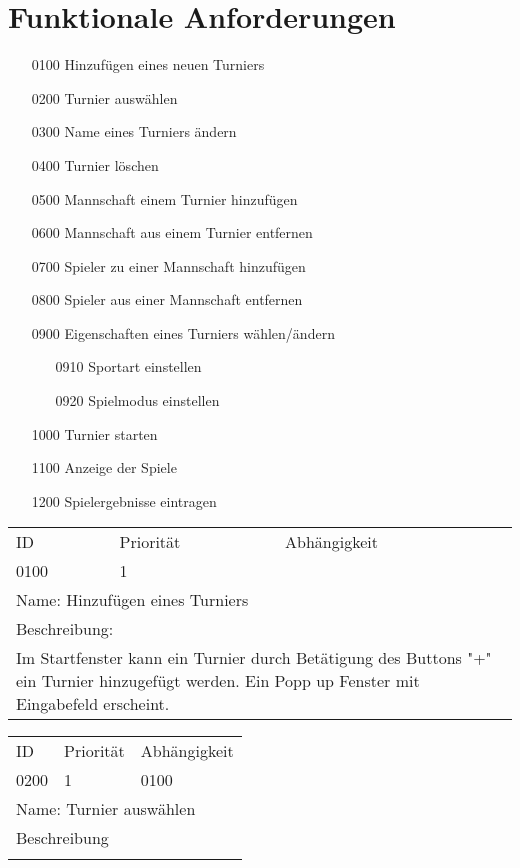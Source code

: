 \section{Funktionale Anforderungen}
	\begin{itemize}
		\item[0100] Hinzufügen eines neuen Turniers
		\item[0200] Turnier auswählen
		\item[0300] Name eines Turniers ändern
		\item[0400] Turnier löschen
		\item[0500] Mannschaft einem Turnier hinzufügen
		\item[0600] Mannschaft aus einem Turnier entfernen
		\item[0700] Spieler zu einer Mannschaft hinzufügen
		\item[0800] Spieler aus einer Mannschaft entfernen
		\item[0900] Eigenschaften eines Turniers wählen/ändern
		\begin{itemize}
			\item[0910] Sportart einstellen
			\item[0920] Spielmodus einstellen
		\end{itemize}
		\item[1000] Turnier starten
		\item[1100] Anzeige der Spiele
		\item[1200] Spielergebnisse eintragen
	\end{itemize}
	
	\begin{tabularx}{\textwidth}{|X|X|X|}
		\hline
		ID & Priorität & Abhängigkeit \\
		0100 & 1 & \\
		\hline
		\multicolumn{3}{|l|}{Name: Hinzufügen eines Turniers} \\
		\hline		
		\multicolumn{3}{|l|}{Beschreibung:}\\
		\multicolumn{3}{|l|}{Im Startfenster kann ein Turnier durch Betätigung des Buttons "+" ein Turnier hinzugefügt werden. Ein Popp up Fenster mit Eingabefeld erscheint.}\\
		\hline		 
	\end{tabularx}
	
	\begin{tabularx}{\textwidth}{|X|X|X|}
		\hline
		ID & Priorität & Abhängigkeit \\
		0200 & 1 & 0100\\
		\hline
		\multicolumn{3}{|l|}{Name: Turnier auswählen} \\
		\hline
		\multicolumn{3}{|l|}{Beschreibung}\\
		\multicolumn{3}{|l|}{}\\
		\hline		 
	\end{tabularx}
	
